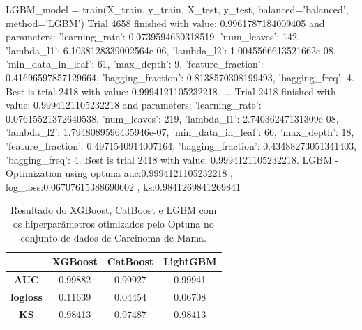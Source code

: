 \begin{codigo}[caption={Resultado do Optuna no conjunto de dados de Carcinoma de Mama.}, label={codigo:res:op:can}, language=Python, breaklines=true]
LGBM_model = train(X_train, y_train, X_test, y_test, balanced='balanced', method='LGBM')
Trial 4658 finished with value: 0.9961787184009405 and parameters: {'learning_rate': 0.0739594630318519, 'num_leaves': 142, 'lambda_l1': 6.1038128339002564e-06, 'lambda_l2': 1.0045566613521662e-08, 'min_data_in_leaf': 61, 'max_depth': 9, 'feature_fraction': 0.41696597857129664, 'bagging_fraction': 0.8138570308199493, 'bagging_freq': 4}. Best is trial 2418 with value: 0.9994121105232218.
...
Trial 2418 finished with value: 0.9994121105232218 and parameters: {'learning_rate': 0.07615521372640538, 'num_leaves': 219, 'lambda_l1': 2.74036247131309e-08, 'lambda_l2': 1.7948089596435946e-07, 'min_data_in_leaf': 66, 'max_depth': 18, 'feature_fraction': 0.4971540914007164, 'bagging_fraction': 0.43488273051341403, 'bagging_freq': 4}. Best is trial 2418 with value: 0.9994121105232218.
LGBM - Optimization using optuna
auc:0.9994121105232218 , log_loss:0.06707615388690602 , ks:0.9841269841269841
\end{codigo}

\begin{table}[H]
\centering
\begin{tabular}{|c|c|c|c|}
\hline
	& \textbf{XGBoost} &\textbf{CatBoost} & \textbf{LightGBM} \\
\hline
\textbf{AUC}	& 0.99882 &	0.99927 &0.99941 \\
\hline
\textbf{logloss}	& 0.11639	&0.04454 &	0.06708 \\
\hline
\textbf{KS}	&0.98413	&0.97487 &	0.98413 \\
\hline
\end{tabular}
\caption{Resultado do XGBoost, CatBoost e LGBM com os hiperparâmetros otimizados pelo Optuna no conjunto de dados de Carcinoma de Mama.}\label{res:can:op}
\end{table}

